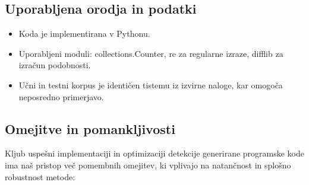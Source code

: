 \documentclass[sigconf,nonacm]{acmart}
\begin{document}
\subsection{Uporabljena orodja in podatki}
\begin{itemize}
	\item Koda je implementirana v Pythonu.
	\item Uporabljeni moduli: collections.Counter, re za regularne izraze, difflib za izračun podobnosti.
	\item Učni in testni korpus je identičen tistemu iz izvirne naloge, kar omogoča neposredno primerjavo.
\end{itemize}

\subsection{Omejitve in pomankljivosti}
Kljub uspešni implementaciji in optimizaciji detekcije generirane programske kode ima naš pristop več pomembnih omejitev, ki vplivajo na natančnost in splošno robustnost metode:
\end{document}
